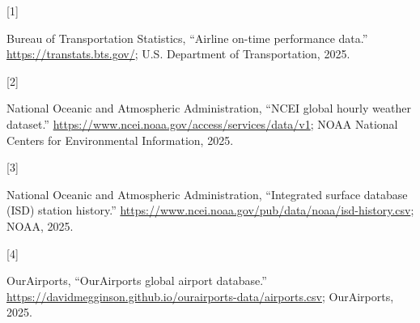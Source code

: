 \documentclass[
  letterpaper,
  DIV=11,
  numbers=noendperiod]{scrartcl}
\newlength{\cslhangindent}
\newlength{\csllabelwidth}
\newenvironment{CSLReferences}[2] %
 {\begin{list}{}{%
  \setlength{\itemindent}{0pt}
  \setlength{\leftmargin}{0pt}
  \setlength{\parsep}{0pt}
  \ifodd #1
   \setlength{\leftmargin}{\cslhangindent}
   \setlength{\itemindent}{-1\cslhangindent}
  \fi
  \setlength{\itemsep}{#2\baselineskip}}}
 {\end{list}}
\newcommand{\CSLLeftMargin}[1]{\parbox[t]{\csllabelwidth}{\strut#1\strut}}
\newcommand{\CSLRightInline}[1]{\parbox[t]{\linewidth - \csllabelwidth}{\strut#1\strut}}
\begin{document}
\protect{}\label{refs}
\begin{CSLReferences}{0}{0}
\CSLLeftMargin{{[}1{]} }%
\CSLRightInline{Bureau of Transportation Statistics, {``Airline on-time
performance data.''} \url{https://transtats.bts.gov/}; U.S. Department
of Transportation, 2025.}

\CSLLeftMargin{{[}2{]} }%
\CSLRightInline{National Oceanic and Atmospheric Administration, {``NCEI
global hourly weather dataset.''}
\url{https://www.ncei.noaa.gov/access/services/data/v1}; NOAA National
Centers for Environmental Information, 2025.}

\CSLLeftMargin{{[}3{]} }%
\CSLRightInline{National Oceanic and Atmospheric Administration,
{``Integrated surface database (ISD) station history.''}
\url{https://www.ncei.noaa.gov/pub/data/noaa/isd-history.csv}; NOAA,
2025.}

\CSLLeftMargin{{[}4{]} }%
\CSLRightInline{OurAirports, {``OurAirports global airport database.''}
\url{https://davidmegginson.github.io/ourairports-data/airports.csv};
OurAirports, 2025.}

\end{CSLReferences}
\end{document}
